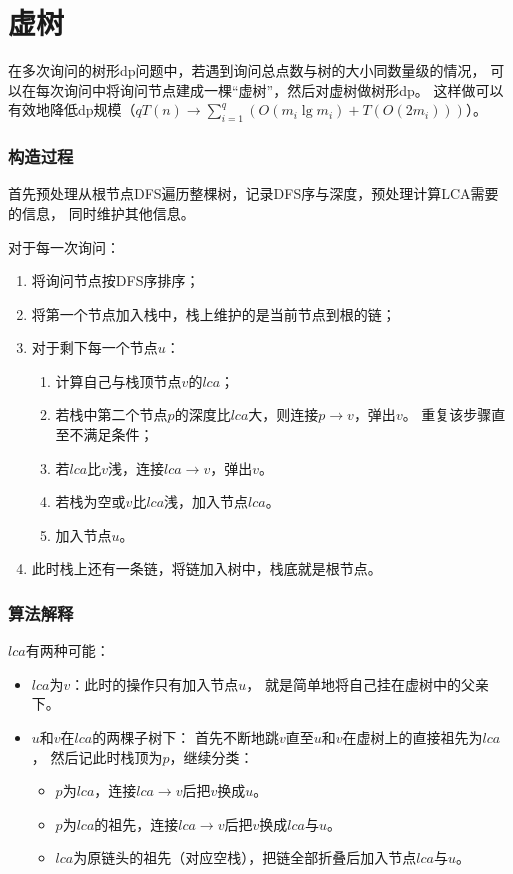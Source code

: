 \section{虚树}
在多次询问的树形dp问题中，若遇到询问总点数与树的大小同数量级的情况，
可以在每次询问中将询问节点建成一棵``虚树''，然后对虚树做树形dp。
这样做可以有效地降低dp规模（$\displaystyle qT(n)\rightarrow
\sum_{i=1}^q{\left(O(m_i\lg m_i)+T(O(2m_i))\right)}$）。

\subsubsection{构造过程}

首先预处理从根节点DFS遍历整棵树，记录DFS序与深度，预处理计算LCA需要的信息，
同时维护其他信息。

对于每一次询问：
\begin{enumerate}
    \item 将询问节点按DFS序排序；
    \item 将第一个节点加入栈中，栈上维护的是当前节点到根的链；
    \item 对于剩下每一个节点$u$：
    \begin{enumerate}
        \item 计算自己与栈顶节点$v$的$lca$；
        \item 若栈中第二个节点$p$的深度比$lca$大，则连接$p\rightarrow v$，弹出$v$。
        重复该步骤直至不满足条件；
        \item 若$lca$比$v$浅，连接$lca\rightarrow v$，弹出$v$。
        \item 若栈为空或$v$比$lca$浅，加入节点$lca$。
        \item 加入节点$u$。
    \end{enumerate}
    \item 此时栈上还有一条链，将链加入树中，栈底就是根节点。
\end{enumerate}
\subsubsection{算法解释}

$lca$有两种可能：
\begin{itemize}
    \item $lca$为$v$：此时的操作只有加入节点$u$，
    就是简单地将自己挂在虚树中的父亲下。
    \item $u$和$v$在$lca$的两棵子树下：
    首先不断地跳$v$直至$u$和$v$在虚树上的直接祖先为$lca$，
    然后记此时栈顶为$p$，继续分类：
    \begin{itemize}
        \item $p$为$lca$，连接$lca\rightarrow v$后把$v$换成$u$。
        \item $p$为$lca$的祖先，连接$lca\rightarrow v$后把$v$换成$lca$与$u$。
        \item $lca$为原链头的祖先（对应空栈），把链全部折叠后加入节点$lca$与$u$。
    \end{itemize}
\end{itemize}

